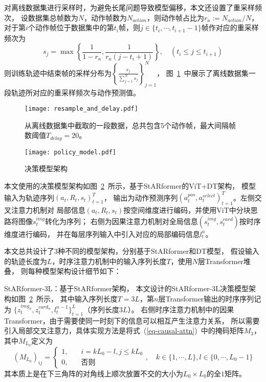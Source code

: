 对离线数据集进行采样时，为避免长尾问题导致模型偏移，本文还设置了重采样频次，
设数据集总帧数为$N$，动作帧数为$N_{action}$，则动作帧占比为$r_a:=N_{action} / N$，
对于第$i$个动作帧位于数据集中的第$t_i$帧，则$j\in\{t_{i},\cdots,t_{i+1}-1\}$帧作对应的重采样频次为
\begin{equation}\label{eq-resample-freq}
  s_j = \max\left\{\frac{1}{1-r_a}, \frac{1}{r_a(j-t_i+1)}\right\},\quad (t_i\leqslant j\leqslant t_{i+1})
\end{equation}
则训练轨迹中结束帧的采样分布为$\left\{\frac{s_j}{\sum_{j=1}^{N}s_j}\right\}_{j=1}^N$，
图~\ref{fig-resample-and-delay}~中展示了离线数据集一段轨迹所对应的重采样频次与动作预测值。
\begin{figure}[htbp]
  \centering
  \texttt{[image: resample\_and\_delay.pdf]}
  \caption{从离线数据集中截取的一段数据，总共包含5个动作帧，最大间隔帧数阈值$T_{delay} = 20$。}\label{fig-resample-and-delay}
\end{figure}

\label{sec-model-struct}
\begin{figure}[htbp]
  \centering\vspace{-2ex}
  \texttt{[image: policy\_model.pdf]}
  \caption{决策模型架构}
  \label{fig-model}
\end{figure}

本文使用的决策模型架构如图~\ref{fig-model}~所示，基于StARformer的ViT+DT架构，
模型输入为轨迹序列$(a_t, R_t, s_t)_{t=1}^T$，
输出为动作预测序列$(a_t^{pos},a_t^{select})_{t=1}^T$。左侧交叉注意力机制对
局部信息$(a_t,R_t,s_t)$按空间维度进行编码，并使用ViT中分块思路将图像$s_t^{img}$转化为序列；
右侧为因果注意力机制对全局信息$(s^{img}_t,s^{card}_t)$按时序维度进行编码，
并在每层序列输入中引入对应的局部编码信息$l_t^{n}$。

本文总共设计了3种不同的模型架构，分别基于StARformer和DT模型，
假设输入的轨迹长度为$L$，时序注意力机制中的输入序列长度$T$，使用$N$层Transformer堆叠，
则每种模型架构设计细节如下：

StARformer-3L：基于StARformer架构，
本文设计的StARformer-3L决策模型架构如图~\ref{fig-model}~所示，
其中输入序列长度$T=3L$，第$n$层Transformer输出的时序序列记为
$\{z_t^{img_n},z_t^{card_n},l_{t}^{n-1}\}_{t=1}^{L}$（序列长度$3L$）。
右侧时序注意力机制中的因果Transformer，由于需要使同一时刻下的信息可以相互产生注意力关系，
所以需要引入局部交叉注意力，具体实现方法是将式~(\ref{eq-causal-attn})~中的掩码矩阵$M_{3}$，其中$M_{L_0}$定义为
\begin{equation}
  (M_{L_0})_{ij} = \begin{cases}
    1, &\quad i=kL_0-l,j\leqslant kL_0\\
    0, &\quad \text{否则}
  \end{cases},\quad k\in\{1,\cdots,L\}, l\in\{0,\cdots,L_0-1\}
\end{equation}
其本质上是在下三角阵的对角线上顺次放置不交的大小为$L_0\times L_0$的全$1$矩阵。

